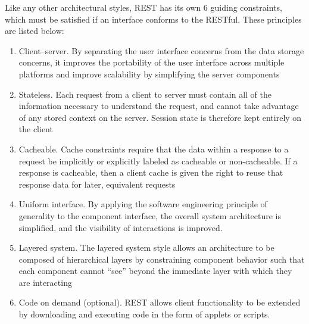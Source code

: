 Like any other architectural styles, REST has its own 6 guiding constraints, which must be satisfied if an interface conforms to the RESTful. These principles are listed below:
\begin{enumerate}
  \item Client–server. By separating the user interface concerns from the data storage concerns, it improves the portability of the user interface across multiple platforms and improve scalability by simplifying the server components
  \item Stateless. Each request from a client to server must contain all of the information necessary to understand the request, and cannot take advantage of any stored context on the server. Session state is therefore kept entirely on the client
  \item Cacheable. Cache constraints require that the data within a response to a request be implicitly or explicitly labeled as cacheable or non-cacheable. If a response is cacheable, then a client cache is given the right to reuse that response data for later, equivalent requests
  \item Uniform interface. By applying the software engineering principle of generality to the component interface, the overall system architecture is simplified, and the visibility of interactions is improved.
  \item Layered system. The layered system style allows an architecture to be composed of hierarchical layers by constraining component behavior such that each component cannot ``see'' beyond the immediate layer with which they are interacting
  \item Code on demand (optional). REST allows client functionality to be extended by downloading and executing code in the form of applets or scripts.
\end{enumerate}

